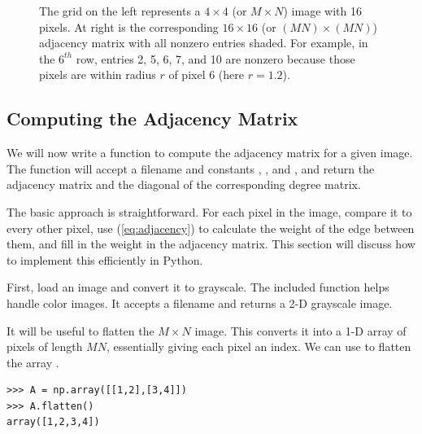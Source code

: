 \begin{figure}

\caption{The grid on the left represents a $4\times4$ (or $M \times N$) image with 16 pixels. 
At right is the corresponding $16 \times 16$ (or $(MN) \times (MN)$) adjacency matrix with all nonzero entries shaded.
For example, in the $6^{th}$ row, entries 2, 5, 6, 7, and 10 are nonzero because those pixels are within radius $r$ of pixel 6 (here $r = 1.2$).}
\label{fig:adjacency}
\end{figure}


\subsection*{Computing the Adjacency Matrix}
We will now write a function to compute the adjacency matrix for a given image.
The function will accept a filename and constants , , and , and return the adjacency matrix and the diagonal of the corresponding degree matrix. 

The basic approach is straightforward. 
For each pixel in the image, compare it to every other pixel, use (\ref{eq:adjacency}) to calculate the weight of the edge between them, and fill in the weight in the adjacency matrix.
This section will discuss how to implement this efficiently in Python.

First, load an image and convert it to grayscale. 
The included function  helps handle color images.
It accepts a filename and returns a 2-D grayscale image.

It will be useful to flatten the $M \times N$ image.
This converts it into a 1-D array of pixels of length $MN$, essentially giving each pixel an index. 
We can use  to flatten the array .
\begin{lstlisting}
>>> A = np.array([[1,2],[3,4]])
>>> A.flatten()                
array([1,2,3,4])
\end{lstlisting}

